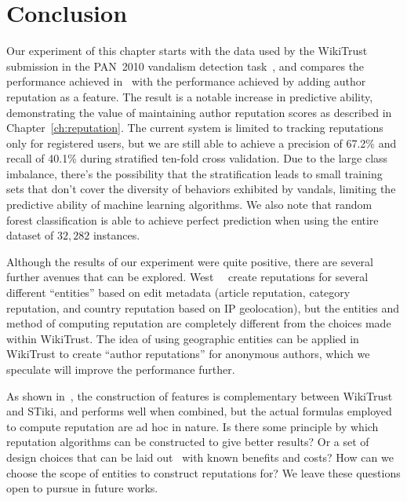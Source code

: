 \section{Conclusion}

Our experiment of this chapter starts with the data used by the
WikiTrust submission in the PAN~2010 vandalism detection
task~\cite{Adler2010b}, and compares the performance achieved
in~\cite{Potthast2010b}
with the performance achieved by adding author reputation as a feature.
The result is a notable increase in predictive ability, demonstrating
the value of maintaining author reputation scores as described in
Chapter~\ref{ch:reputation}.
The current system is limited to tracking reputations only for
registered users, but we are still able to achieve a precision of 67.2\%
and recall of 40.1\% during stratified ten-fold cross validation.
Due to the large class imbalance, there's the possibility that the
stratification leads to small training sets that don't cover the
diversity of behaviors exhibited by vandals, limiting the predictive
ability of machine learning algorithms.
We also note that random forest classification is able to achieve
perfect prediction when using the entire dataset of $32,282$ instances.

Although the results of our experiment were quite positive, there are
several further avenues that can be explored.
West~\etal~\cite{West2010} create reputations for several different
``entities'' based on edit metadata (\eg article reputation, category
reputation, and country reputation based on IP geolocation), but the
entities and method of computing reputation are completely different
from the choices made within WikiTrust.
The idea of using geographic entities can be applied in WikiTrust to
create ``author reputations'' for anonymous authors, which we speculate
will improve the performance further.

As shown in~\cite{Adler2011a}, the construction of features is complementary
between WikiTrust and STiki, and performs well when combined, but the
actual formulas employed to compute reputation are ad hoc in nature.
Is there some principle by which reputation algorithms can be
constructed to give better results?
Or a set of design choices that can be laid out~\cite{Adler2011b} with
known benefits and costs?
How can we choose the scope of entities to construct reputations for?
We leave these questions open to pursue in future works.



